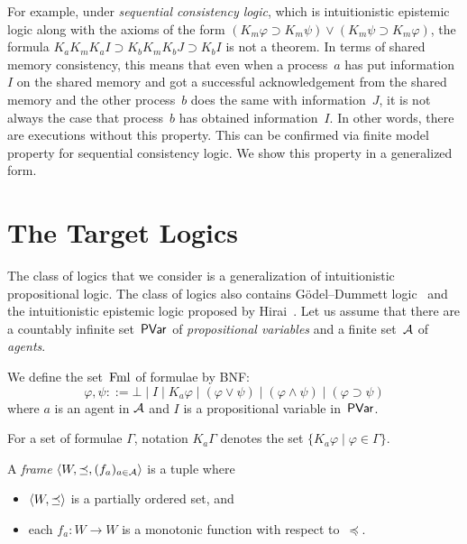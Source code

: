  For example,
 under \textit{sequential consistency logic}, which is intuitionistic epistemic
 logic along with the axioms of the form
 $(K_m\varphi\supset K_m\psi) \vee (K_m\psi\supset K_m\varphi)$,
 the formula $K_aK_mK_aI \supset K_bK_mK_bJ\supset K_bI$ is not a
 theorem.
 In terms of shared memory consistency, this means that even when a
 process~$a$ has put information~$I$ on the shared memory and got a
 successful acknowledgement from the shared memory and the other
 process~$b$ does the same with information~$J$, it is not always the
 case that process~$b$ has obtained information~$I$\kern -2pt.
 In other words, there are executions without this property.
 This can be confirmed via
 finite model property for sequential consistency logic.
 We show this property in a generalized form.

  \section{The Target Logics}
  \label{logic}

  The class of logics that we consider is a generalization of
  intuitionistic propositional logic.
  The class of logics also contains G\"{o}del--Dummett logic~\cite{dummett59}
  and the intuitionistic epistemic logic proposed by
  Hirai~\cite{hirailpar}.
  Let us assume that
  there are a countably infinite set~$\mathsf{PVar}$ of \textit{propositional variables} and a
  finite set~$\mathcal A$ of \textit{agents}.

  \begin{definition}
   We define the set~$\mathsf{\operatorname{Fml}}$ of formulae by BNF:
   \[
   \varphi,\psi ::= \bot\mid I\mid K_a\varphi\mid (\varphi\vee\psi)\mid
   (\varphi\land\psi)\mid (\varphi\supset\psi)
   \]
   where $a$ is an agent in $\mathcal A$
   and $I$ is a propositional variable in~$\mathsf{PVar}$.
  \end{definition}

  For a set of formulae $\Gamma\!$, notation $K_a\Gamma$ denotes the set
  $\{K_a\varphi\mid\varphi\in\Gamma\}$\enspace.

  \begin{definition}
   A \textit{frame} $\langle{W,\preceq,(f_a)_{a\in \mathcal A}}\rangle$ is a tuple where
   \begin{itemize}
    \item $\langle{W,\preceq}\rangle$ is a partially ordered set, and
    \item each $f_a\colon W\rightarrow W$ is a monotonic function with
	  respect to~$\preceq$.
   \end{itemize}
  \end{definition}

